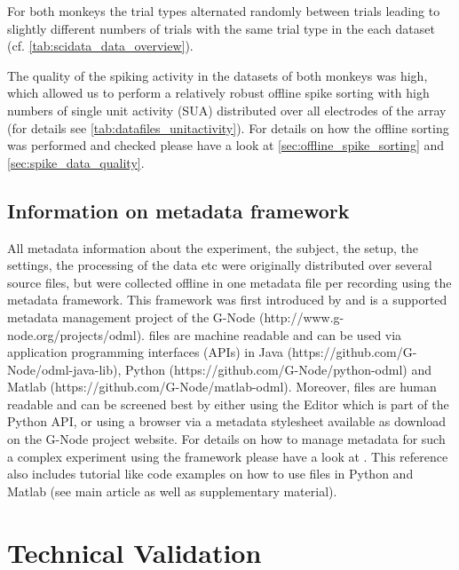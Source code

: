 {For both monkeys the trial types alternated randomly between trials leading to slightly different numbers of trials with the same trial type in the each dataset (cf. \cref{tab:scidata_data_overview}). 



The quality of the spiking activity in the datasets of both monkeys was high, which allowed us to perform a relatively robust offline spike sorting with high numbers of single unit activity (SUA) distributed over all electrodes of the array (for details see \cref{tab:datafiles_unitactivity}). For details on how the offline sorting was performed and checked please have a look at \cref{sec:offline_spike_sorting} and \cref{sec:spike_data_quality}. 

\subsection{Information on metadata framework}
\label{sec:scidata_metadat_framework}

 All metadata information about the experiment, the subject, the setup, the settings, the processing of the data etc were originally distributed over several source files, but were collected offline in one metadata file per recording using the  metadata framework. This  framework was first introduced by \citet{Grewe_2011} and is a supported metadata management project of the G-Node (http://www.g-node.org/projects/odml).  files are machine readable and can be used via application programming interfaces (APIs) in Java (https://github.com/G-Node/odml-java-lib), Python (https://github.com/G-Node/python-odml) and Matlab (https://github.com/G-Node/matlab-odml). Moreover,  files are human readable and can be screened best by either using the  Editor which is part of the  Python API, or using a browser via a metadata stylesheet available as download on the G-Node project website. For details on how to manage metadata for such a complex experiment using the  framework please have a look at \citet{Zehl_2016}. This reference also includes tutorial like code examples on how to use  files in Python and Matlab (see main article as well as supplementary material).

\section{Technical Validation}

}
